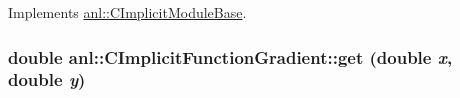 Implements \hyperlink{classanl_1_1CImplicitModuleBase_ac17d592612c82ba3d47f9229a00b1fe3}{anl::CImplicitModuleBase}.\hypertarget{classanl_1_1CImplicitFunctionGradient_ab9f146161cbb8ab46ee5260467139c8b}{
\subsubsection[{get}]{\setlength{\rightskip}{0pt plus 5cm}double anl::CImplicitFunctionGradient::get (double {\em x}, \/  double {\em y})}}
\label{classanl_1_1CImplicitFunctionGradient_ab9f146161cbb8ab46ee5260467139c8b}


